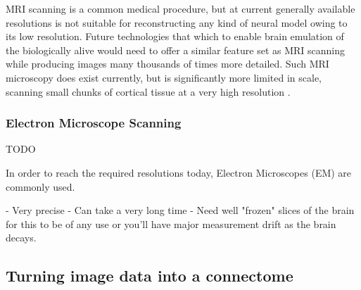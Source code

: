 MRI scanning is a common medical procedure, but at current generally available
resolutions is not suitable for reconstructing any kind of neural model owing to
its low resolution. Future technologies that which to enable brain emulation of
the biologically alive would need to offer a similar feature set as MRI scanning
while producing images many thousands of times more detailed. Such MRI
microscopy does exist currently, but is significantly more limited
in scale, scanning small chunks of cortical tissue at a very high resolution
\autocite{johnson_three-dimensional_1987,bostrom_whole_2008}.

\subsubsection*{Electron Microscope Scanning}

TODO

In order to reach the required resolutions today, Electron Microscopes (EM) are
commonly used. 

- Very precise
- Can take a very long time
- Need well "frozen" slices of the brain for this to be of any use or you'll
have major measurement drift as the brain decays.

\subsection{Turning image data into a connectome}

